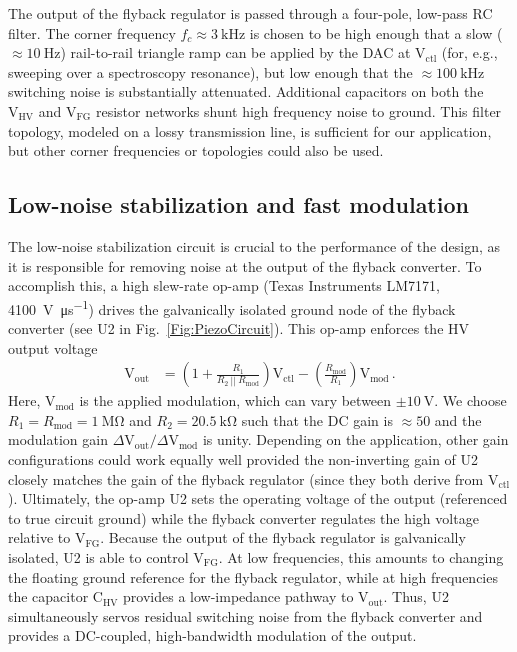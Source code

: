 \documentclass[aip,rsi,reprint]{revtex4-1} %
\begin{document}
The output of the flyback regulator is passed through a four-pole, low-pass RC filter.
The corner frequency $f_c \approx \SI{3}{\kilo\hertz}$ is chosen to be high enough that a slow ($\approx \SI{10}{\hertz}$) rail-to-rail triangle ramp can be applied by the DAC at $\text{V}_\text{ctl}$ (for, e.g., sweeping over a spectroscopy resonance), but low enough that the $\approx \SI{100}{\kilo\hertz}$ switching noise is substantially attenuated.
Additional capacitors on both the $\text{V}_\text{HV}$ and $\text{V}_\text{FG}$ resistor networks shunt high frequency noise to ground.
This filter topology, modeled on a lossy transmission line, is sufficient for our application, but other corner frequencies or topologies could also be used.

\subsection{Low-noise stabilization and fast modulation}
\label{Sec:LowNoiseStabilization}

The low-noise stabilization circuit is crucial to the performance of the design, as it is responsible for removing noise at the output of the flyback converter.
To accomplish this, a high slew-rate op-amp (Texas Instruments LM7171, \SI[per-mode=symbol]{4100}{\volt\per\micro\second}) drives the galvanically isolated ground node of the flyback converter (see U2 in Fig.~\ref{Fig:PiezoCircuit}).
This op-amp enforces the HV output voltage
\begin{align}
\text{V}_\text{out} &= \left(1 + \frac{R_1}{R_2~||~R_\text{mod}}\right) \text{V}_\text{ctl} -
\left(\frac{R_\text{mod}}{R_1}\right) \text{V}_\text{mod}\,.
\label{Eq:FullTransferFunc}
\end{align}
Here, $\text{V}_\text{mod}$ is the applied modulation, which can vary between $\pm\SI{10}{\volt}$.
We choose $R_1 = R_\text{mod} = \SI{1}{\mega\ohm}$ and $R_2 = \SI{20.5}{\kilo\ohm}$ such that the DC gain is $\approx 50$ and the modulation gain $\Delta\text{V}_\text{out}/\Delta\text{V}_\text{mod}$ is unity.
Depending on the application, other gain configurations could work equally well provided the non-inverting gain of U2 closely matches the gain of the flyback regulator (since they both derive from $\text{V}_\text{ctl}$).
Ultimately, the op-amp U2 sets the operating voltage of the output (referenced to true circuit ground) while the flyback converter regulates the high voltage relative to $\text{V}_\text{FG}$.
Because the output of the flyback regulator is galvanically isolated, U2 is able to control $\text{V}_\text{FG}$. 
At low frequencies, this amounts to changing the floating ground reference for the flyback regulator, while at high frequencies the capacitor $\text{C}_\text{HV}$ provides a low-impedance pathway to $\text{V}_\text{out}$.
Thus, U2 simultaneously servos residual switching noise from the flyback converter and provides a DC-coupled, high-bandwidth modulation of the output.
\end{document}

